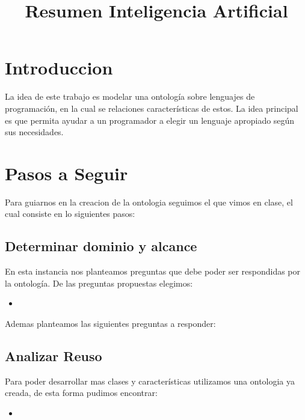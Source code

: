 \documentclass[12pt, titlepage, a4paper]{article}
\title{Resumen Inteligencia Artificial}
\author{}
\begin{document}
\section{Introduccion}
La idea de este trabajo es modelar una ontología sobre lenguajes de  
programación, en la cual se relaciones características de estos. La idea 
principal es que permita ayudar a un programador a elegir un lenguaje 
apropiado según sus necesidades. 

\section{Pasos a Seguir}
Para guiarnos en la creacion de la ontologia seguimos el  que 
vimos en clase, el cual consiste en lo siguientes pasos:

\subsection{Determinar dominio y alcance}
En esta instancia nos planteamos preguntas que debe poder ser respondidas  
por la ontología. De las preguntas propuestas elegimos: 
\begin{itemize}
    \item {} 
\end{itemize}

Ademas planteamos las siguientes preguntas a responder:

\subsection{Analizar Reuso}
Para poder desarrollar mas clases y características utilizamos una ontologia 
ya creada, de esta forma pudimos encontrar:
\begin{itemize}
    \item %
\end{itemize}
\end{document}
